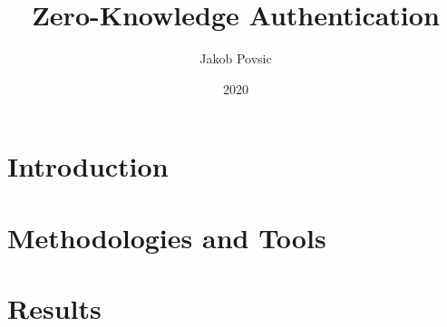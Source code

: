 \documentclass[12pt]{report}
\title{Zero-Knowledge Authentication}
\author{Jakob Povsic}
\date{2020}
\begin{document}

\maketitle
\newpage

\tableofcontents
\newpage




\chapter{Introduction}


\chapter{Methodologies and Tools}






\chapter{Results}



%


\end{document}
